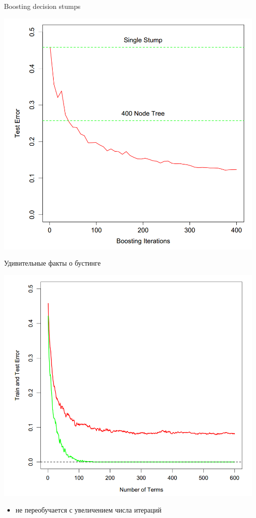 \documentclass[10pt]{beamer}
\begin{document}
\begin{frame}{Boosting decision stumps}
\begin{center}
    \includegraphics[scale=0.25]{images/boostingstumps.png}
\end{center}
\end{frame}

\begin{frame}{Удивительные факты о бустинге}
\begin{center}
    \includegraphics[scale=0.2]{images/interestingboosting.png}
\end{center}
\begin{itemize}
    \item не переобучается с увеличением числа итераций
\end{itemize}
\end{frame}
\end{document}
